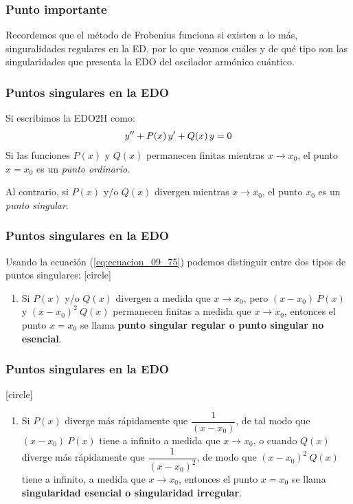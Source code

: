 \documentclass[12pt]{beamer}
\begin{document}
\begin{frame}
\frametitle{Punto importante}
Recordemos que el método de Frobenius funciona si existen a lo más, singuralidades regulares en la ED, por lo que veamos cuáles y de qué tipo son las singularidades que presenta la EDO del oscilador armónico cuántico. 
\end{frame}
\begin{frame}
\frametitle{Puntos singulares en la EDO}
Si escribimos la EDO2H como:
\pause
\begin{align}
{y}^{\prime \prime} + P(x) \, {y}^{\prime} + Q(x) \, y = 0
\label{eq:ecuacion_09_75}
\end{align}
\pause
Si las funciones $P(x)$ y $Q(x)$ permanecen finitas mientras $x \to x_{0}$, el punto $x = x_{0}$ es un \emph{punto ordinario}.
\par
\pause
Al contrario, si $P(x)$ y/o $Q(x)$ divergen mientras $x \to x_{0}$, el punto $x_{0}$ es un \emph{punto singular}.
\end{frame}
\begin{frame}
\frametitle{Puntos singulares en la EDO}
Usando la ecuación (\ref{eq:ecuacion_09_75}) podemos distinguir entre dos tipos de puntos singulares:
\pause
{}
[circle]
\begin{enumerate}[<+->]
\item Si $P(x)$ y/o $Q(x)$ divergen a medida que $x \to x_{0}$, pero $(x - x_{0}) \: P(x)$ y $(x - x_{0})^{2} \: Q(x)$ permanecen finitas a medida que $x \to x_{0}$, entonces el punto $x = x_{0}$ se llama \textbf{punto singular regular o punto singular no esencial}.
\seti
\end{enumerate}
\end{frame}
\begin{frame}
\frametitle{Puntos singulares en la EDO}
[circle]
\begin{enumerate}[<+->]
\conti
\item Si $P(x)$ diverge más rápidamente que $\dfrac{1}{(x - x_{0})}$, de tal modo que $(x - x_{0}) \: P(x)$ tiene a infinito a medida que $x \to x_{0}$, o cuando $Q(x)$ diverge más rápidamente que $\dfrac{1}{(x - x_{0})^{2}}$, de modo que $(x - x_{0})^{2} \: Q(x)$ tiene a infinito, a medida que $x \to x_{0}$, entonces el punto $x = x_{0}$ se llama \textbf{singularidad esencial o singularidad irregular}.
\end{enumerate}
\end{frame}
\end{document}
